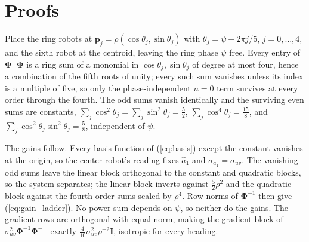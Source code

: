 \documentclass[lettersize,journal]{IEEEtran}
\begin{document}
\appendices

\section{Proofs}
\label{app:proofs}

\begin{IEEEproof}
Place the ring robots at $\mathbf{p}_j = \rho(\cos\theta_j,
\sin\theta_j)$ with $\theta_j = \psi + 2\pi j/5$, $j = 0, \ldots, 4$, and
the sixth robot at the centroid, leaving the ring phase $\psi$ free.
Every entry of $\boldsymbol{\Phi}^\top\boldsymbol{\Phi}$ is a ring sum of
a monomial in $\cos\theta_j, \sin\theta_j$ of degree at most four, hence a
combination of the fifth roots of unity; every such sum vanishes unless
its index is a multiple of five, so only the phase-independent $n = 0$
term survives at every order through the fourth. The odd sums vanish
identically and the surviving even sums are constants,
$\sum_j\cos^2\theta_j = \sum_j\sin^2\theta_j = \tfrac{5}{2}$,
$\sum_j\cos^4\theta_j = \tfrac{15}{8}$, and $\sum_j\cos^2\theta_j
\sin^2\theta_j = \tfrac{5}{8}$, independent of $\psi$.

The gains follow. Every basis function of (\ref{eq:basis}) except the
constant vanishes at the origin, so the center robot's reading fixes
$\hat{a}_1$ and $\sigma_{a_1} = \sigma_{uv}$. The vanishing odd sums
leave the linear block orthogonal to the constant and quadratic blocks,
so the system separates; the linear block inverts against
$\tfrac{5}{2}\rho^2$ and the quadratic block against the fourth-order
sums scaled by $\rho^4$. Row norms of $\boldsymbol{\Phi}^{-1}$ then give
(\ref{eq:gain_ladder}). No power sum depends on
$\psi$, so neither do the gains. The gradient rows are orthogonal with
equal norm, making the gradient block of $\sigma_{uv}^2
\boldsymbol{\Phi}^{-1}\boldsymbol{\Phi}^{-\top}$ exactly
$\tfrac{4}{10}\sigma_{uv}^2\rho^{-2}\mathbf{I}$, isotropic for every
heading.
\end{IEEEproof}
\end{document}
